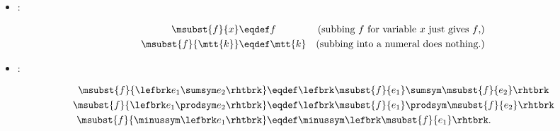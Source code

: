 \begin{definition}
\begin{definition}
\begin{itemize}
\item {}:

\begin{align}
\msubst{f}{x} & \eqdef f \label{subst-var} 
    & \text{(subbing $f$ for variable $x$ just gives $f$,)}\\
\msubst{f}{\mtt{k}} & \eqdef \mtt{k}
    & \text{(subbing into a numeral does nothing.)}\label{subst-const}
\end{align}


\item {}:

\begin{align}
\msubst{f}{\lefbrk e_1 \sumsym e_2\rhtbrk} & \eqdef  \lefbrk \msubst{f}{e_1} \sumsym
\msubst{f}{e_2}\rhtbrk\label{subst-sum}\\
\msubst{f}{\lefbrk e_1 \prodsym e_2\rhtbrk} & \eqdef  \lefbrk \msubst{f}{e_1} \prodsym
\msubst{f}{e_2}\rhtbrk\label{subst-prod} \\
\msubst{f}{\minussym\lefbrk e_1\rhtbrk} & \eqdef \minussym \lefbrk
       \msubst{f}{e_1}\rhtbrk.\label{subst-minus} 
\end{align}
\end{itemize}
\end{definition}


\end{definition}
